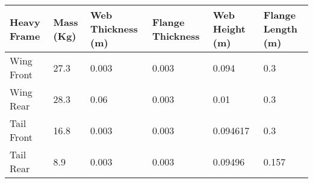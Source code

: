 \begin{tabular}{llllll}
Heavy Frame & Mass (Kg) & Web Thickness (m) & Flange Thickness & Web Height (m) & Flange Length (m) \\ 
\hline 
Wing Front & 27.3 & 0.003 & 0.003 & 0.094 & 0.3 \\ 
Wing Rear & 28.3 & 0.06 & 0.003 & 0.01 & 0.3 \\ 
Tail Front & 16.8 & 0.003 & 0.003 & 0.094617 & 0.3 \\ 
Tail Rear & 8.9 & 0.003 & 0.003 & 0.09496 & 0.157 \\ 
\hline 
\end{tabular}